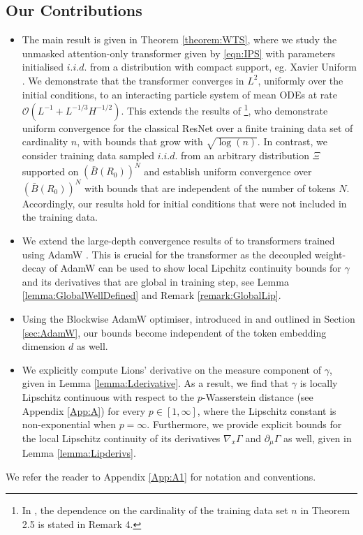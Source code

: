 \documentclass{article}
\begin{document}
\subsection{Our Contributions}
\begin{itemize}
    \item The main result is given in Theorem \ref{theorem:WTS}, where we study the unmasked attention-only transformer given by \eqref{eqn:IPS} with parameters initialised $i.i.d.$ from a distribution with compact support, eg. Xavier Uniform \cite{pmlr-v9-glorot10a}. We demonstrate that the transformer converges in $L^2$, uniformly over the initial conditions, to an interacting particle system of mean ODEs at rate $\mathcal O(L^{-1}+L^{-1/3}H^{-1/2})$. This extends the results of \cite{chizat2025hiddenwidthdeepresnets,chaintron2026resnets}\footnote{In \cite{chaintron2026resnets}, the dependence on the cardinality of the training data set $n$ in Theorem 2.5 is stated in Remark 4.}, who demonstrate uniform convergence for the classical ResNet over a finite training data set of cardinality $n$, with bounds that grow with $\sqrt{\log(n)}$. In contrast, we consider training data sampled $i.i.d.$ from an arbitrary distribution $\Xi$ supported on $(\bar B(R_0))^N$ and establish uniform convergence over $(\bar B(R_0))^N$ with bounds that are independent of the number of tokens $N$. Accordingly, our results hold for initial conditions that were not included in the training data.
    \item We extend the large-depth convergence results of \cite{avelin2020neuralodesdeeplimit,ding2021globalconvergencegradientdescent,gao2024global,marion2024implicit} to transformers trained using AdamW \cite{loshchilov2018decoupled}. This is crucial for the transformer as the decoupled weight-decay of AdamW can be used to show local Lipchitz continuity bounds for $\gamma$ and its derivatives that are global in training step, see Lemma \ref{lemma:GlobalWellDefined} and Remark \ref{remark:GlobalLip}.
    \item Using the Blockwise AdamW optimiser, introduced in \cite{xie2024adam} and outlined in Section \ref{sec:AdamW}, our bounds become independent of the token embedding dimension $d$ as well.
    \item  We explicitly compute Lions' derivative on the measure component of $\gamma$, given in Lemma \ref{lemma:Lderivative}. As a result, we find that $\gamma$ is locally Lipschitz continuous with respect to the $p$-Wasserstein distance (see Appendix \ref{App:A}) for every $p\in[1,\infty]$, where the Lipschitz constant is non-exponential when $p=\infty$. Furthermore, we provide explicit bounds for the local Lipschitz continuity of its derivatives $\nabla_x\Gamma$ and $\partial_\mu \Gamma$ as well, given in Lemma \ref{lemma:Lipderivs}. 
\end{itemize}
We refer the reader to Appendix \ref{App:A1} for notation and conventions.
\end{document}

